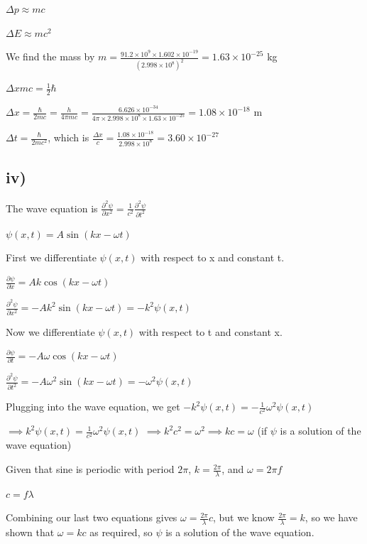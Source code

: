 \documentclass{article}
\begin{document}
$\Delta p \approx mc$

$\Delta E \approx mc^2$

We find the mass by $m = \frac{91.2 \times 10^9 \times 1.602\times 10^{-19}}{(2.998\times10^8)^2} = 1.63 \times 10^{-25}$ kg

$\Delta x mc = \frac{1}{2}\hbar$

$\Delta x = \frac{\hbar}{2mc} = \frac{h}{4 \pi m c} = \frac{6.626\times10^{-34}}{4 \pi \times 2.998 \times 10^8 \times 1.63 \times 10^{-25}} = 1.08 \times 10^{-18}$ m

$\Delta t = \frac{\hbar}{2mc^2}$, which is $\frac{\Delta x}{c} = \frac{1.08\times10^{-18}}{2.998\times10^8} = 3.60 \times 10^{-27}$

\subsection*{iv)}
The wave equation is $\frac{\partial^2 \psi}{\partial x^2} = \frac{1}{c^2}\frac{\partial^2 \psi}{\partial t^2}$

$\psi(x,t) = A\sin(kx-\omega t)$
\newline

First we differentiate $\psi(x,t)$ with respect to x and constant t.

$\frac{\partial \psi}{\partial x} = Ak\cos(kx-\omega t)$

$\frac{\partial^2 \psi}{\partial x^2} = -Ak^2\sin(kx - \omega t) = -k^2 \psi(x,t)$
\newline

Now we differentiate $\psi(x,t)$ with respect to t and constant x.

$\frac{\partial \psi}{\partial t} = -A\omega \cos(kx-\omega t)$

$\frac{\partial^2 \psi}{\partial t^2} = -A\omega^2\sin(kx - \omega t) = -\omega ^2 \psi(x,t)$
\newline

Plugging into the wave equation, we get
$ -k^2 \psi(x,t) = -\frac{1}{c^2} \omega^2 \psi(x,t)$

$ \implies k^2 \psi(x,t) = \frac{1}{c^2} \omega^2 \psi(x,t)$
$ \implies k^2c^2= \omega ^2 \implies kc = \omega$ (if $\psi$ is a solution of the wave equation)
\newline

Given that sine is periodic with period $2\pi$, $k = \frac{2\pi}{\lambda}$, and $\omega = 2\pi f$

$c = f\lambda$

Combining our last two equations gives $\omega = \frac{2\pi}{\lambda}c$, but we know $\frac{2\pi}{\lambda} = k$, so we have shown that $\omega = kc$ as required, so $\psi$ is a solution of the wave equation.
\end{document}
